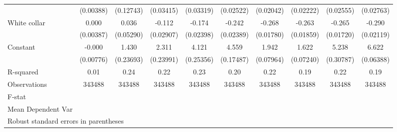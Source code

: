 {\begin{tabular}{l*{9}{c}}
                    &   (0.00388)         &   (0.12743)         &   (0.03415)         &   (0.03319)         &   (0.02522)         &   (0.02042)         &   (0.02222)         &   (0.02555)         &   (0.02763)         \\
White collar        &       0.000         &       0.036         &      -0.112\sym{***}&      -0.174\sym{***}&      -0.242\sym{***}&      -0.268\sym{***}&      -0.263\sym{***}&      -0.265\sym{***}&      -0.290\sym{***}\\
                    &   (0.00387)         &   (0.05290)         &   (0.02907)         &   (0.02398)         &   (0.02389)         &   (0.01780)         &   (0.01859)         &   (0.01720)         &   (0.02119)         \\
Constant            &      -0.000         &       1.430\sym{***}&       2.311\sym{***}&       4.121\sym{***}&       4.559\sym{***}&       1.942\sym{***}&       1.622\sym{***}&       5.238\sym{***}&       6.622\sym{***}\\
                    &   (0.00776)         &   (0.23693)         &   (0.23991)         &   (0.25356)         &   (0.17487)         &   (0.07964)         &   (0.07240)         &   (0.30787)         &   (0.06388)         \\
\hline
R-squared           &        0.01         &        0.24         &        0.22         &        0.23         &        0.20         &        0.22         &        0.19         &        0.22         &        0.19         \\
Observations        &      343488         &      343488         &      343488         &      343488         &      343488         &      343488         &      343488         &      343488         &      343488         \\
F-stat              &                     &                     &                     &                     &                     &                     &                     &                     &                     \\
Mean Dependent Var  &                     &                     &                     &                     &                     &                     &                     &                     &                     \\
\hline\hline
\multicolumn{10}{l}{\footnotesize Robust standard errors in parentheses}\\
\end{tabular}
}
